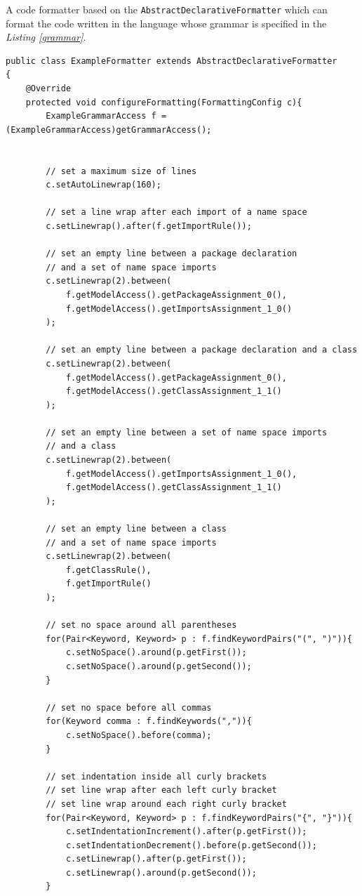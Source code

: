 \documentclass[12pt,notitlepage,a4paper]{report}
\begin{document}
\begin{expl} \label{abstractDeclarativeFormatterExample}
A code formatter based on the \texttt{AbstractDeclarativeFormatter} which can format the code written in the language whose grammar is specified in the \textit{Listing \ref{grammar}}.
\begingroup
\fontsize{10pt}{12pt}
\begin{verbatim}
public class ExampleFormatter extends AbstractDeclarativeFormatter
{
    @Override
    protected void configureFormatting(FormattingConfig c){
        ExampleGrammarAccess f = (ExampleGrammarAccess)getGrammarAccess();
		

        // set a maximum size of lines
        c.setAutoLinewrap(160);
		
        // set a line wrap after each import of a name space 
        c.setLinewrap().after(f.getImportRule());
		
        // set an empty line between a package declaration 
        // and a set of name space imports 
        c.setLinewrap(2).between(
            f.getModelAccess().getPackageAssignment_0(), 
            f.getModelAccess().getImportsAssignment_1_0()
        );
		
        // set an empty line between a package declaration and a class 
        c.setLinewrap(2).between(
            f.getModelAccess().getPackageAssignment_0(),
            f.getModelAccess().getClassAssignment_1_1()
        );
		
        // set an empty line between a set of name space imports 
        // and a class
        c.setLinewrap(2).between(
            f.getModelAccess().getImportsAssignment_1_0(),
            f.getModelAccess().getClassAssignment_1_1()
        );
		
        // set an empty line between a class 
        // and a set of name space imports
        c.setLinewrap(2).between(
            f.getClassRule(),
            f.getImportRule()
        );
		
        // set no space around all parentheses
        for(Pair<Keyword, Keyword> p : f.findKeywordPairs("(", ")")){
            c.setNoSpace().around(p.getFirst());
            c.setNoSpace().around(p.getSecond());
        }
	    
        // set no space before all commas
        for(Keyword comma : f.findKeywords(",")){
            c.setNoSpace().before(comma);
        }
		
        // set indentation inside all curly brackets 
        // set line wrap after each left curly bracket
        // set line wrap around each right curly bracket
        for(Pair<Keyword, Keyword> p : f.findKeywordPairs("{", "}")){
            c.setIndentationIncrement().after(p.getFirst());
            c.setIndentationDecrement().before(p.getSecond());
            c.setLinewrap().after(p.getFirst());
            c.setLinewrap().around(p.getSecond());
        }
		

\end{verbatim}
\end{expl}
\end{document}
